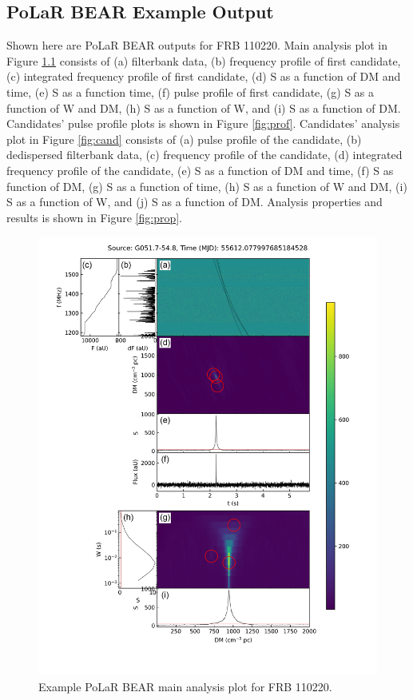 \begin{appendices}
\chapter{PoLaR BEAR Example Output}\label{app:polarbear}
Shown here are PoLaR BEAR outputs for FRB 110220. Main analysis plot in Figure \ref{fig:main} consists of (a) filterbank data, (b) frequency profile of first candidate, (c) integrated frequency profile of first candidate, (d) S as a function of DM and time, (e) S as a function time, (f) pulse profile of first candidate, (g) S as a function of W and DM, (h) S as a function of W, and (i) S as a function of DM. Candidates' pulse profile plots is shown in Figure \ref{fig:prof}. Candidates' analysis plot in Figure \ref{fig:cand} consists of (a) pulse profile of the candidate, (b) dedispersed filterbank data, (c) frequency profile of the candidate, (d) integrated frequency profile of the candidate, (e) S as a function of DM and time, (f) S as function of DM, (g) S as a function of time, (h) S as a function of W and DM, (i) S as a function of W, and (j) S as a function of DM. Analysis properties and results is shown in Figure \ref{fig:prop}.

\begin{figure}
    \centering
    \includegraphics[width=\textwidth]{Images/Example/main.png}
    \caption[Example PoLaR BEAR main analysis plot]{Example PoLaR BEAR main analysis plot for FRB 110220.}
    \label{fig:main}
\end{figure}


\end{appendices}
